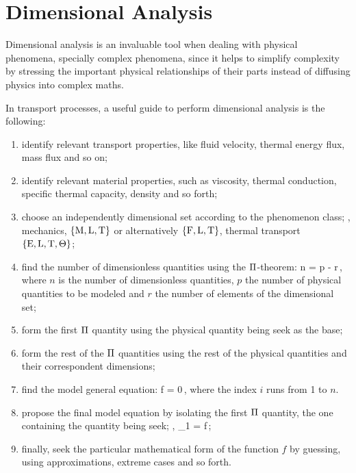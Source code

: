 \section{Dimensional Analysis}
%
Dimensional analysis is an invaluable tool when dealing with physical phenomena, specially complex phenomena, since it helps to simplify complexity by stressing the important physical relationships of their parts instead of diffusing physics into complex maths.

In transport processes, a useful guide to perform dimensional analysis is the following:
\begin{enumerate}
\item identify relevant transport properties, like fluid velocity, thermal energy flux, mass flux and so on;
\item identify relevant material properties, such as viscosity, thermal conduction, specific thermal capacity, density and so forth;
\item choose an independently dimensional set according to the phenomenon class; \ie, mechanics, $\left\lbrace{\text{M}, \text{L}, \text{T}}\right\rbrace$ or alternatively $\left\lbrace{\text{F}, \text{L}, \text{T}}\right\rbrace$, thermal transport $\left\lbrace{\text{E}, \text{L}, \text{T}, \Theta}\right\rbrace$;
\item find the number of dimensionless quantities using the $\Pi$-theorem:
\beq
n = p - r\,,
\eeq
where $n$ is the number of dimensionless quantities, $p$ the number of physical quantities to be modeled and $r$ the number of elements of the dimensional set;
\item form the first $\Pi$ quantity using the physical quantity being seek as the base;
\item form the rest of the $\Pi$ quantities using the rest of the physical quantities and their correspondent dimensions;
\item find the model general equation:
\beq
f = 0\,,
\eeq
where the index $i$ runs from 1 to $n$.
\item propose the final model equation by isolating the first $\Pi$ quantity, the one containing the quantity being seek; \ie,
\beq
\kdim_1 = f\,;
\eeq
\item finally, seek the particular mathematical form of the function $f$ by guessing, using approximations, extreme cases and so forth.
\end{enumerate}

